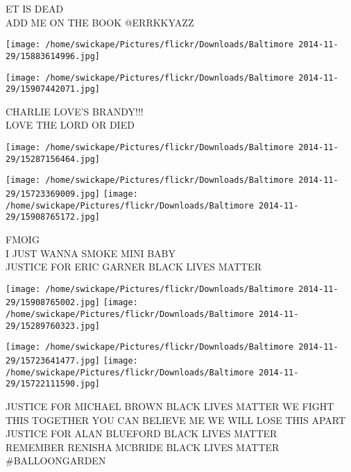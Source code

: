 \documentclass[10pt,letterpaper]{article}
\begin{document}
ET IS DEAD\\
ADD ME ON THE BOOK @ERRKKYAZZ
\pagebreak

\texttt{[image: /home/swickape/Pictures/flickr/Downloads/Baltimore 2014-11-29/15883614996.jpg]}

\vspace{0.25in}
\texttt{[image: /home/swickape/Pictures/flickr/Downloads/Baltimore 2014-11-29/15907442071.jpg]}

CHARLIE LOVE'S BRANDY!!!\\
LOVE THE LORD OR DIED
\pagebreak

\texttt{[image: /home/swickape/Pictures/flickr/Downloads/Baltimore 2014-11-29/15287156464.jpg]}

\vspace{0.25in}
\texttt{[image: /home/swickape/Pictures/flickr/Downloads/Baltimore 2014-11-29/15723369009.jpg]}
\texttt{[image: /home/swickape/Pictures/flickr/Downloads/Baltimore 2014-11-29/15908765172.jpg]}

FMOIG\\
I JUST WANNA SMOKE MINI BABY\\
JUSTICE FOR ERIC GARNER BLACK LIVES MATTER
\pagebreak

\texttt{[image: /home/swickape/Pictures/flickr/Downloads/Baltimore 2014-11-29/15908765002.jpg]}
\texttt{[image: /home/swickape/Pictures/flickr/Downloads/Baltimore 2014-11-29/15289760323.jpg]}

\texttt{[image: /home/swickape/Pictures/flickr/Downloads/Baltimore 2014-11-29/15723641477.jpg]}
\texttt{[image: /home/swickape/Pictures/flickr/Downloads/Baltimore 2014-11-29/15722111590.jpg]}

JUSTICE FOR MICHAEL BROWN BLACK LIVES MATTER WE FIGHT THIS TOGETHER YOU CAN BELIEVE ME WE WILL LOSE THIS APART\\
JUSTICE FOR ALAN BLUEFORD BLACK LIVES MATTER\\
REMEMBER RENISHA MCBRIDE BLACK LIVES MATTER\\
\#BALLOONGARDEN
\pagebreak
\end{document}
